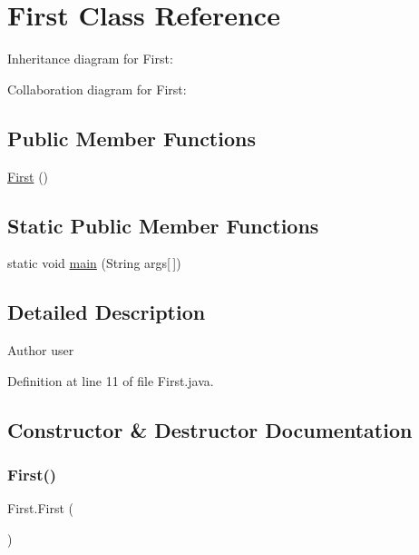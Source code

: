 \hypertarget{class_first}{}\section{First Class Reference}
\label{class_first}


Inheritance diagram for First\+:


Collaboration diagram for First\+:
\subsection*{Public Member Functions}
\begin{DoxyCompactItemize}
\item 
\mbox{\hyperlink{class_first_a005216652c1fce72bc21f38e367fc6dd}{First}} ()
\end{DoxyCompactItemize}
\subsection*{Static Public Member Functions}
\begin{DoxyCompactItemize}
\item 
static void \mbox{\hyperlink{class_first_a4fdb5976b7fdc07e45c9936e47d40789}{main}} (String args\mbox{[}$\,$\mbox{]})
\end{DoxyCompactItemize}


\subsection{Detailed Description}
\begin{DoxyAuthor}{Author}
user 
\end{DoxyAuthor}


Definition at line 11 of file First.\+java.



\subsection{Constructor \& Destructor Documentation}
\mbox{\label{class_first_a005216652c1fce72bc21f38e367fc6dd}} 
\subsubsection{\texorpdfstring{First()}{First()}}
{\footnotesize\ttfamily First.\+First (\begin{DoxyParamCaption}{ }\end{DoxyParamCaption})}

